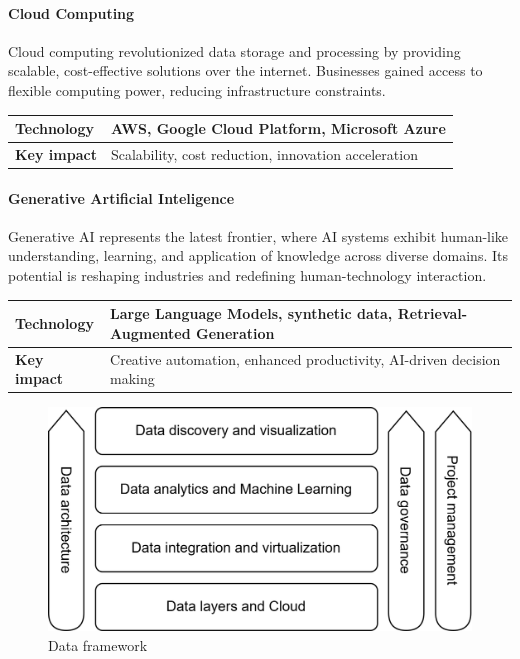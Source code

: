 \paragraph*{Cloud Computing}
Cloud computing revolutionized data storage and processing by providing scalable, cost-effective solutions over the internet. 
Businesses gained access to flexible computing power, reducing infrastructure constraints.
\renewcommand*{\arraystretch}{1.5}
\begin{table}[H]
    \centering
    \begin{tabular}{|l|l|}
    \hline
    \textbf{Technology} & AWS, Google Cloud Platform, Microsoft Azure                                 \\ \hline
    \textbf{Key impact} & Scalability, cost reduction, innovation acceleration \\ \hline
    \end{tabular}
\end{table}
\renewcommand*{\arraystretch}{1}

\paragraph*{Generative Artificial Inteligence}
Generative AI represents the latest frontier, where AI systems exhibit human-like understanding, learning, and application of knowledge across diverse domains.
Its potential is reshaping industries and redefining human-technology interaction.
\renewcommand*{\arraystretch}{1.5}
\begin{table}[H]
    \centering
    \begin{tabular}{|l|l|}
    \hline
    \textbf{Technology} & Large Language Models, synthetic data, Retrieval-Augmented Generation                                 \\ \hline
    \textbf{Key impact} & Creative automation, enhanced productivity, AI-driven decision making \\ \hline
    \end{tabular}
\end{table}
\renewcommand*{\arraystretch}{1}

\begin{figure}[H]
    \centering
    \includegraphics[width=0.5\linewidth]{images/bis10.png}
    \caption{Data framework}
\end{figure}


